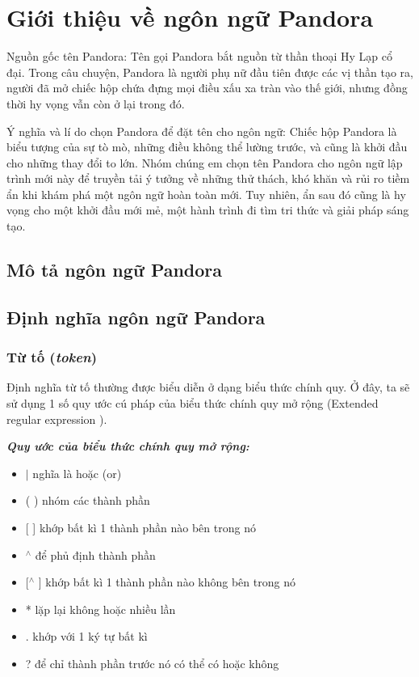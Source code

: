 \section{Giới thiệu về ngôn ngữ Pandora}
Nguồn gốc tên Pandora: 
    Tên gọi Pandora bắt nguồn từ thần thoại 
    Hy Lạp cổ đại. Trong câu chuyện, Pandora là người phụ nữ đầu tiên được 
    các vị thần tạo ra, người đã mở chiếc hộp chứa đựng mọi điều xấu xa tràn 
    vào thế giới, nhưng đồng thời hy vọng vẫn còn ở lại trong đó.

Ý nghĩa và lí do chọn Pandora để đặt tên cho ngôn ngữ: 
    Chiếc hộp Pandora là biểu tượng của sự tò mò, những điều không thể 
    lường trước, và cũng là khởi đầu cho những thay đổi to lớn. Nhóm chúng 
    em chọn tên Pandora cho ngôn ngữ lập trình mới này để truyền tải ý 
    tưởng về những thử thách, khó khăn và rủi ro tiềm ẩn khi khám phá một 
    ngôn ngữ hoàn toàn mới. Tuy nhiên, ẩn sau đó cũng là hy vọng cho một 
    khởi đầu mới mẻ, một hành trình đi tìm tri thức và giải pháp sáng tạo.


\subsection{Mô tả ngôn ngữ Pandora}
\subsection{Định nghĩa ngôn ngữ Pandora}
\subsubsection{Từ tố (\textit{token})}
Định nghĩa từ tố thường được biểu diễn ở dạng biểu thức chính quy\cite{li2008regular}. Ở đây, ta sẽ sử dụng 1 số quy ước cú pháp của biểu thức chính quy mở rộng (Extended regular expression \cite{freydenberger2013extended}).

\textbf{\textit{Quy ước của biểu thức chính quy mở rộng:}}

\begin{itemize}
    \item{$|$ nghĩa là hoặc (or)}
    \item{( ) nhóm các thành phần}
    \item{[ ] khớp bất kì 1 thành phần nào bên trong nó}
    \item{$^\wedge$ để phủ định thành phần}
    \item{[$^\wedge$ ] khớp bất kì 1 thành phần nào không bên trong nó}
    \item{* lặp lại không hoặc nhiều lần}
    \item{. khớp với 1 ký tự bất kì}
    \item{? để chỉ thành phần trước nó có thể có hoặc không}
\end{itemize}

